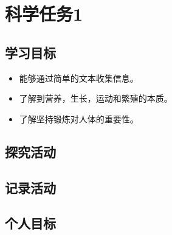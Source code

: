 \chapter{科学任务1}

\section{学习目标}

\begin{itemize}
  \item 能够通过简单的文本收集信息。
  \item 了解到营养，生长，运动和繁殖的本质。
  \item 了解坚持锻炼对人体的重要性。
\end{itemize}  


\section{探究活动}
    

\section{记录活动}


\section{个人目标}





